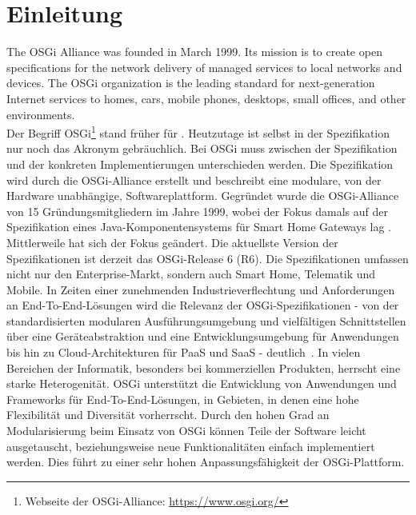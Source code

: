 \chapter{Einleitung}
\glqq The OSGi\texttrademark{} Alliance was founded in March 1999. Its mission is to create open specifications for 
the network delivery of managed services to local networks and devices. The OSGi organization is
the leading standard for next-generation Internet services to homes, cars, mobile phones, desktops,
small offices, and other environments.\grqq\ \cite[S. 9]{osgi_r6}\\

Der Begriff \acs{OSGi}\footnote{Webseite der OSGi-Alliance: \url{https://www.osgi.org/}} stand früher für . Heutzutage ist selbst in der Spezifikation nur noch das Akronym gebräuchlich.
Bei \ac{OSGi} muss zwischen der Spezifikation und der konkreten Implementierungen unterschieden werden. Die Spezifikation wird durch die \ac{OSGi}-Alliance erstellt und
beschreibt eine modulare, von der Hardware unabhängige, Softwareplattform. Gegründet wurde die \ac{OSGi}-Alliance von 15 Gründungsmitgliedern im Jahre 1999,
wobei der Fokus damals auf der Spezifikation eines Java-Komponentensystems für Smart Home Gateways lag \cite{heise_osgi}.
Mittlerweile hat sich der Fokus geändert. Die aktuellste Version der Spezifikationen ist derzeit das \ac{OSGi}-Release 6 (R6). 
\glqq Die Spezifikationen umfassen nicht nur den Enterprise-Markt, sondern auch Smart Home, Telematik und Mobile. In Zeiten einer zunehmenden Industrieverflechtung und Anforderungen
an End-To-End-Lösungen wird die Relevanz der \ac{OSGi}-Spezifikationen - von der standardisierten modularen Ausführungsumgebung und vielfältigen Schnittstellen über
eine Geräteabstraktion und eine Entwicklungsumgebung für Anwendungen bis hin zu Cloud-Architekturen für PaaS und SaaS - deutlich\grqq\ \cite{osgi_iot_und_mobile}.
In vielen Bereichen der Informatik, besonders bei kommerziellen Produkten, herrscht eine starke Heterogenität.
\ac{OSGi} unterstützt die Entwicklung von Anwendungen und Frameworks für End-To-End-Lösungen, in Gebieten, in denen eine hohe Flexibilität und Diversität vorherrscht.
Durch den hohen Grad an Modularisierung beim Einsatz von \ac{OSGi} können Teile der Software leicht ausgetauscht, beziehungsweise neue Funktionalitäten einfach implementiert werden.
Dies führt zu einer sehr hohen Anpassungsfähigkeit der \ac{OSGi}-Plattform.\\

